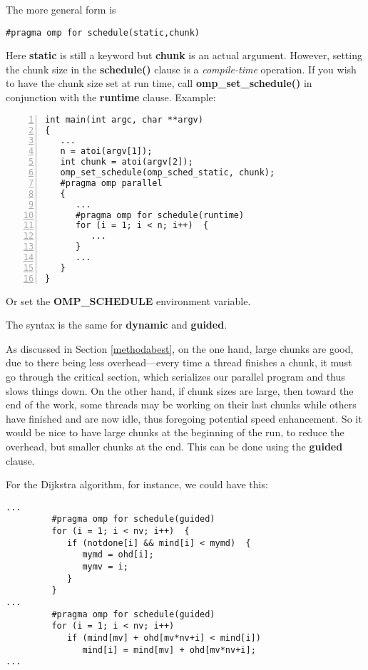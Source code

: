 The more general form is

\begin{Verbatim}[fontsize=\relsize{-2}]
#pragma omp for schedule(static,chunk)
\end{Verbatim}

Here {\bf static} is still a keyword but {\bf chunk} is an actual
argument.  However, setting the chunk size in the {\bf schedule()}
clause is a {\it compile-time} operation.  If you wish to have the chunk
size set at run time, call {\bf omp\_set\_schedule()} in conjunction
with the {\bf runtime} clause.  Example:

\begin{lstlisting}[numbers=left]
int main(int argc, char **argv)
{
   ...
   n = atoi(argv[1]);
   int chunk = atoi(argv[2]);
   omp_set_schedule(omp_sched_static, chunk);
   #pragma omp parallel
   {
      ...
      #pragma omp for schedule(runtime)
      for (i = 1; i < n; i++)  {
         ...
      }
      ...
   }
}
\end{lstlisting}


Or set the {\bf OMP\_SCHEDULE} environment variable.

The syntax is the same for {\bf dynamic} and {\bf guided}.

As discussed in Section \ref{methodabest}, on the one hand, large chunks
are good, due to there being less overhead---every time a thread
finishes a chunk, it must go through the critical section, which
serializes our parallel program and thus slows things down.  On the
other hand, if chunk sizes are large, then toward the end of the work,
some threads may be working on their last chunks while others have
finished and are now idle, thus foregoing potential speed enhancement.
So it would be nice to have large chunks at the beginning of the run, to
reduce the overhead, but smaller chunks at the end.  This can be done
using the {\bf guided} clause.

For the Dijkstra algorithm, for instance, we could have this:

\begin{Verbatim}[fontsize=\relsize{-2}]
...
         #pragma omp for schedule(guided)
         for (i = 1; i < nv; i++)  {
            if (notdone[i] && mind[i] < mymd)  {
               mymd = ohd[i];
               mymv = i;
            }
         }
...
         #pragma omp for schedule(guided)
         for (i = 1; i < nv; i++)
            if (mind[mv] + ohd[mv*nv+i] < mind[i])
               mind[i] = mind[mv] + ohd[mv*nv+i];
...
\end{Verbatim}

